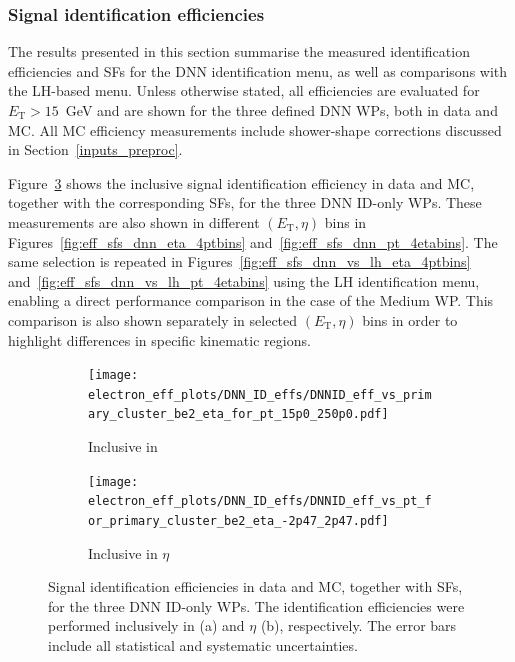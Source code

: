 
\subsubsection{Signal identification efficiencies}

The results presented in this section summarise the measured identification efficiencies and SFs for the DNN identification menu, as well as comparisons with the LH-based menu. Unless otherwise stated, all efficiencies are evaluated for $E_{\mathrm{T}}>15$~GeV and are shown for the three defined DNN WPs, both in data and MC. All MC efficiency measurements include shower-shape corrections discussed in Section~\ref{inputs_preproc}.

Figure~\ref{fig:eff_sfs_dnn_inclusive} shows the inclusive signal identification efficiency in data and MC, together with the corresponding SFs, for the three DNN ID-only WPs. These measurements are also shown in different $(E_{\mathrm{T}},\eta)$ bins in Figures~\ref{fig:eff_sfs_dnn_eta_4ptbins} and~\ref{fig:eff_sfs_dnn_pt_4etabins}. The same selection is repeated in Figures~\ref{fig:eff_sfs_dnn_vs_lh_eta_4ptbins} and~\ref{fig:eff_sfs_dnn_vs_lh_pt_4etabins} using the LH identification menu, enabling a direct performance comparison in the case of the Medium WP. This comparison is also shown separately in selected $(E_{\mathrm{T}},\eta)$ bins in order to highlight differences in specific kinematic regions. 

\begin{figure}[htbp]
  \centering
  \begin{subfigure}{0.48\textwidth}
    \centering
    \texttt{[image: electron\_eff\_plots/DNN\_ID\_effs/DNNID\_eff\_vs\_primary\_cluster\_be2\_eta\_for\_pt\_15p0\_250p0.pdf]}
    \caption{Inclusive in \et}
    \label{fig:eff_inclusive_pt_dnn_id}
  \end{subfigure}
  \hfill
  \begin{subfigure}{0.48\textwidth}
    \centering
    \texttt{[image: electron\_eff\_plots/DNN\_ID\_effs/DNNID\_eff\_vs\_pt\_for\_primary\_cluster\_be2\_eta\_-2p47\_2p47.pdf]}
    \caption{Inclusive in $\eta$}
    \label{fig:eff_inclusive_eta_dnn_id}
  \end{subfigure}
  \caption{Signal identification efficiencies in data and MC, together with SFs, for the three DNN ID-only WPs. The identification efficiencies were performed inclusively in \et (a) and $\eta$ (b), respectively. The error bars include all statistical and systematic uncertainties.}
  \label{fig:eff_sfs_dnn_inclusive}
\end{figure}

